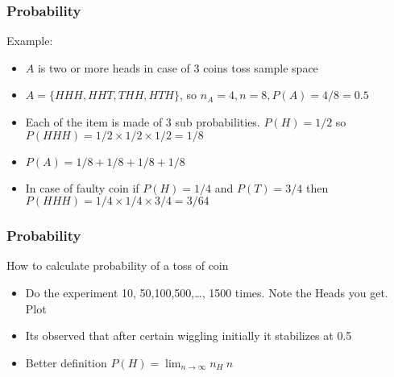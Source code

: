 \begin{frame}[fragile]\frametitle{Probability}
Example: 
\begin{itemize}
\item $A$ is two or more heads in case of 3 coins toss sample space
\item $A = \{  HHH, HHT, THH, HTH \}$, so $n_A = 4, n=8, P(A) = 4/8 = 0.5$
\item Each of the item is made of 3 sub probabilities. $P(H) = 1/2$ so $P(HHH) = 1/2 \times 1/2 \times 1/2 = 1/8$
\item $P(A) = 1/8 + 1/8 + 1/8 + 1/8$
\item In case of faulty coin if $P(H) = 1/4$ and $P(T) = 3/4$ then $P(HHH) = 1/4 \times 1/4 \times 3/4 = 3/64$
\end{itemize}
\end{frame}

\begin{frame}[fragile]\frametitle{Probability}
How to calculate probability of a toss of coin
\begin{itemize}
\item Do the experiment 10, 50,100,500,\ldots, 1500 times. Note the Heads you get. Plot
\item Its observed that after certain wiggling initially it stabilizes at 0.5
\item Better definition $P(H) = \lim_{n \to \infty} n_H \ n$
\end{itemize}
\end{frame}

